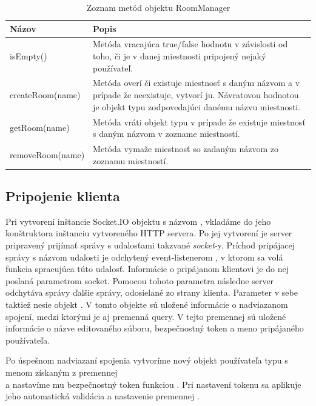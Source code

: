 \begin{table}
	\begin{tabular}{ | m{4cm} | m{8.5cm} | } \hline
		\textbf{Názov} & \textbf{Popis} \\ \hline
		
		isEmpty() & Metóda vracajúca true/false hodnotu v závislosti od toho, či je v danej miestnosti pripojený nejaký používateľ. \\\hline
		createRoom(name) & Metóda overí či existuje miestnosť s daným názvom a v prípade že neexistuje, vytvorí ju. Návratovou hodnotou je objekt typu \code{Room} zodpovedajúci danému názvu miestnosti. \\\hline
		getRoom(name) & Metóda vráti objekt typu \code{Room} v prípade že existuje miestnosť s daným názvom v zozname miestností. \\\hline
		removeRoom(name) & Metóda vymaže miestnosť so zadaným názvom zo zoznamu miestností. \\\hline
		
		\hline
	\end{tabular}
	\caption{Zoznam metód objektu RoomManager}
	\label{tab:server-func-roommanager}
\end{table}
\FloatBarrier

\subsection{Pripojenie klienta}

Pri vytvorení inštancie Socket.IO objektu s názvom , vkladáme do jeho konštruktora inštanciu vytvoreného HTTP servera. Po jej vytvorení je server pripravený prijímať správy s udalosťami takzvané \textit{socket}-y. Príchod pripájacej správy s názvom udalosti   je odchytený event-listenerom  , v ktorom sa volá funkcia spracujúca túto udalosť. Informácie o pripájanom klientovi je do nej poslaná parametrom socket. Pomocou tohoto parametra následne server odchytáva správy ďalšie správy, odosielané zo strany klienta. Parameter v sebe taktiež nesie objekt . V tomto objekte sú uložené informácie o nadviazanom spojení, medzi ktorými je aj premenná query. V tejto premennej sú uložené informácie o názve editovaného súboru, bezpečnostný token a meno pripájaného používateľa. 

Po úspešnom nadviazaní spojenia vytvoríme nový objekt používateľa typu  s menom získaným z premennej \\ a nastavíme mu bezpečnostný token funkciou . Pri nastavení tokenu sa aplikuje jeho automatická validácia a nastavenie premennej .


